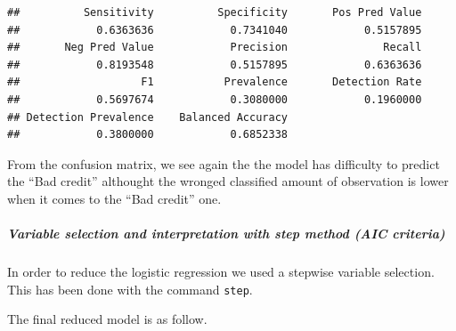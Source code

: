 \documentclass[
]{article}
\begin{document}
\begin{verbatim}
##          Sensitivity          Specificity       Pos Pred Value 
##            0.6363636            0.7341040            0.5157895 
##       Neg Pred Value            Precision               Recall 
##            0.8193548            0.5157895            0.6363636 
##                   F1           Prevalence       Detection Rate 
##            0.5697674            0.3080000            0.1960000 
## Detection Prevalence    Balanced Accuracy 
##            0.3800000            0.6852338
\end{verbatim}

From the confusion matrix, we see again the the model has difficulty to
predict the ``Bad credit'' althought the wronged classified amount of
observation is lower when it comes to the ``Bad credit'' one.

\hypertarget{variable-selection-and-interpretation-with-step-method-aic-criteria}{%
\subparagraph{Variable selection and interpretation with step method
(AIC
criteria)}\label{variable-selection-and-interpretation-with-step-method-aic-criteria}}

In order to reduce the logistic regression we used a stepwise variable
selection. This has been done with the command \texttt{step}.

The final reduced model is as follow.
\end{document}

